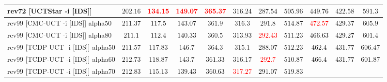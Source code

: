 \documentclass{article}
\begin{document}
\begin{tabular}{|l|r@{$\pm$}rr@{$\pm$}rr@{$\pm$}rr@{$\pm$}rr@{$\pm$}rr@{$\pm$}rr@{$\pm$}rr@{$\pm$}rr@{$\pm$}rr@{$\pm$}r|}
\\
rev72 [UCTStar -i [IDS]]
& \multicolumn{2}{c}{$202.16$}
& \multicolumn{2}{c}{\textbf{\textcolor{red}{134.15}}}
& \multicolumn{2}{c}{\textbf{\textcolor{red}{149.07}}}
& \multicolumn{2}{c}{\textbf{\textcolor{red}{365.37}}}
& \multicolumn{2}{c}{$316.24$}
& \multicolumn{2}{c}{$287.54$}
& \multicolumn{2}{c}{$505.96$}
& \multicolumn{2}{c}{$449.76$}
& \multicolumn{2}{c}{$422.58$}
& \multicolumn{2}{c|}{$591.3$}
\\
\hline
rev99 [CMC-UCT -i [IDS]] alpha50
& \multicolumn{2}{c}{\textbf{$211.37$}}
& \multicolumn{2}{c}{$117.5$}
& \multicolumn{2}{c}{$143.07$}
& \multicolumn{2}{c}{\textbf{$361.9$}}
& \multicolumn{2}{c}{\textbf{$316.3$}}
& \multicolumn{2}{c}{\textbf{$291.8$}}
& \multicolumn{2}{c}{\textbf{$514.87$}}
& \multicolumn{2}{c}{\textbf{\textcolor{red}{$472.57$}}}
& \multicolumn{2}{c}{$429.37$}
& \multicolumn{2}{c|}{\textbf{$605.9$}}
\\
rev99 [CMC-UCT -i [IDS]] alpha80
& \multicolumn{2}{c}{\textbf{$211.1$}}
& \multicolumn{2}{c}{$112.4$}
& \multicolumn{2}{c}{$140.33$}
& \multicolumn{2}{c}{\textbf{$360.5$}}
& \multicolumn{2}{c}{\textbf{$313.93$}}
& \multicolumn{2}{c}{\textbf{\textcolor{red}{$292.43$}}}
& \multicolumn{2}{c}{$511.23$}
& \multicolumn{2}{c}{\textbf{$466.63$}}
& \multicolumn{2}{c}{$429.27$}
& \multicolumn{2}{c|}{$601.4$}
\\
rev99 [TCDP-UCT -i [IDS]] alpha50
& \multicolumn{2}{c}{\textbf{$211.57$}}
& \multicolumn{2}{c}{$117.83$}
& \multicolumn{2}{c}{$146.7$}
& \multicolumn{2}{c}{\textbf{$364.3$}}
& \multicolumn{2}{c}{\textbf{$315.1$}}
& \multicolumn{2}{c}{$288.07$}
& \multicolumn{2}{c}{\textbf{$512.23$}}
& \multicolumn{2}{c}{$462.4$}
& \multicolumn{2}{c}{\textbf{$431.77$}}
& \multicolumn{2}{c|}{\textbf{$606.47$}}
\\
rev99 [TCDP-UCT -i [IDS]] alpha60
& \multicolumn{2}{c}{\textbf{$212.73$}}
& \multicolumn{2}{c}{$118.87$}
& \multicolumn{2}{c}{$143.7$}
& \multicolumn{2}{c}{\textbf{$361.33$}}
& \multicolumn{2}{c}{\textbf{$316.17$}}
& \multicolumn{2}{c}{\textbf{\textcolor{red}{$292.7$}}}
& \multicolumn{2}{c}{$510.87$}
& \multicolumn{2}{c}{\textbf{$466.4$}}
& \multicolumn{2}{c}{\textbf{$431.77$}}
& \multicolumn{2}{c|}{$601.87$}
\\
rev99 [TCDP-UCT -i [IDS]] alpha70
& \multicolumn{2}{c}{\textbf{$212.83$}}
& \multicolumn{2}{c}{$115.13$}
& \multicolumn{2}{c}{$139.43$}
& \multicolumn{2}{c}{\textbf{$360.63$}}
& \multicolumn{2}{c}{\textbf{\textcolor{red}{$317.27$}}}
& \multicolumn{2}{c}{\textbf{$291.07$}}
& \multicolumn{2}{c}{\textbf{$519.83$}}

\end{tabular}
\end{document}

